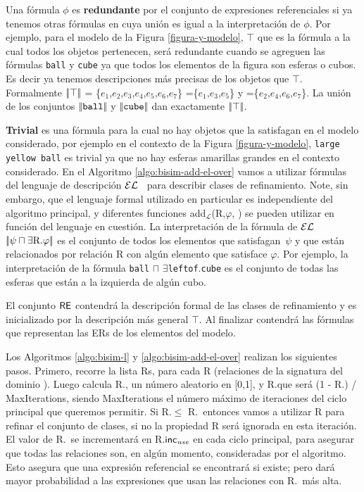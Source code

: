 Una f\'ormula $\phi$ es \textbf{redundante} por el conjunto de expresiones referenciales si ya tenemos otras f\'ormulas en \RE cuya uni\'on es igual a la interpretaci\'on de $\phi$. Por ejemplo, para el modelo de la Figura \ref{figura-y-modelo}, $\top$ que es la f\'ormula a la cual todos los objetos pertenecen, ser\'a redundante cuando se agreguen 
las f\'ormulas \texttt{ball} y \texttt{cube} ya que todos los elementos de la figura son esferas o cubos. Es decir ya tenemos descripciones m\'as precisas de los objetos que $\top$. Formalmente $|\!|\top|\!|$ = \{$e_1$,$e_2$,$e_3$,$e_4$,$e_5$,$e_6$,$e_7$\} =\{$e_1$,$e_3$,$e_5$\} y =\{$e_2$,$e_4$,$e_6$,$e_7$\}. La uni\'on de los conjuntos $|\!|\texttt{ball}|\!|$ y $|\!|\texttt{cube}|\!|$ dan exactamente $|\!|\top|\!|$.

\textbf{Trivial} es una f\'ormula para la cual no hay objetos que la satisfagan en el modelo considerado, por ejemplo en el contexto de la 
Figura \ref{figura-y-modelo}, \texttt{large yellow ball} es trivial ya que no hay esferas amarillas grandes en el contexto considerado.
En el Algoritmo \ref{algo:bisim-add-el-over} vamos a utilizar f\'ormulas del lenguaje de descripci\'on $\mathcal{EL}$~\cite{baader03} para describir clases de refinamiento.
Note, sin embargo, que el lenguaje formal utilizado en particular es independiente del algoritmo principal, y diferentes 
funciones add$_{\mathcal {L}}$(R,$\varphi $, \RE) se pueden utilizar en funci\'on del lenguaje en cuesti\'on.
La interpretaci\'on de la f\'ormula de $\mathcal{EL}$ $\interp{\psi \sqcap \exists $R.$ \varphi}$ es el conjunto de todos los elementos que 
satisfagan~$\psi$ y que est\'an relacionados por relaci\'on R con alg\'un elemento que satisface $\varphi $.
Por ejemplo, la interpretaci\'on de la f\'ormula \texttt{ball} $\sqcap$ $\exists$\texttt{leftof}.\texttt{cube} es el conjunto de todas las esferas que est\'an a la izquierda de alg\'un cubo.

El conjunto $\textsf{RE}$ contendr\'a la descripci\'on formal de las clases de refinamiento
y es inicializado por la descripci\'on m\'as general $\top$. Al finalizar contendr\'a las f\'ormulas que representan las ERs de los elementos del modelo.

Los Algoritmos \ref{algo:bisim-l} y \ref{algo:bisim-add-el-over} realizan los siguientes pasos. Primero, recorre la lista Rs, para cada R (relaciones de la signatura del dominio \REL). Luego calcula R.\randomuse, un n\'umero aleatorio en [0,1], y R.\incuse que ser\'a (1 - R.\puse) / MaxIterations, siendo MaxIterations el n\'umero m\'aximo de iteraciones del ciclo principal que queremos permitir. Si R.\randomuse $\le$ R.\puse\ entonces vamos a utilizar R para refinar el conjunto de
clases, si no la propiedad R ser\'a ignorada en esta iteraci\'on. El valor de R.\puse\ se incrementar\'a en R.$\textsf{inc}_\emph{use}$
en cada ciclo principal, para asegurar que todas las relaciones son, en alg\'un momento,
consideradas por el algoritmo. Esto asegura que una expresi\'on referencial
se encontrar\'a si existe; pero dar\'a mayor probabilidad a las expresiones
que usan las relaciones con R.\puse\ m\'as alta. 

